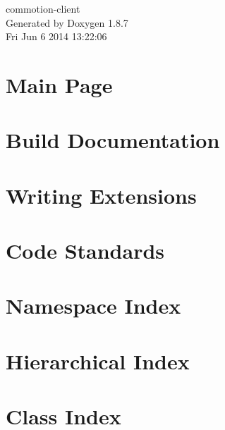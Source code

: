 \documentclass[twoside]{book}
\newcommand{\+}{\discretionary{\mbox{\scriptsize$\hookleftarrow$}}{}{}}
\newcommand{\clearemptydoublepage}{%
  \newpage{\pagestyle{empty}\cleardoublepage}%
}
\begin{document}
\hypersetup{pageanchor=false,
             bookmarks=true,
             bookmarksnumbered=true,
             pdfencoding=unicode
            }
\begin{titlepage}
\vspace*{7cm}
\begin{center}%
{\Large commotion-\/client }\\
\vspace*{1cm}
{\large Generated by Doxygen 1.8.7}\\
\vspace*{0.5cm}
{\small Fri Jun 6 2014 13:22:06}\\
\end{center}
\end{titlepage}
\clearemptydoublepage
\tableofcontents
\clearemptydoublepage
{}
\hypersetup{pageanchor=true}

\chapter{Main Page}
\label{index}\hypertarget{index}{}
\chapter{Build Documentation}
\label{md_build_README}
\hypertarget{md_build_README}{}

\chapter{Writing Extensions}
\label{md_docs_extensions_writing_extensions}
\hypertarget{md_docs_extensions_writing_extensions}{}

\chapter{Code Standards}
\label{md_docs_style_standards_README}
\hypertarget{md_docs_style_standards_README}{}

\chapter{Namespace Index}

\chapter{Hierarchical Index}

\chapter{Class Index}

\end{document}
